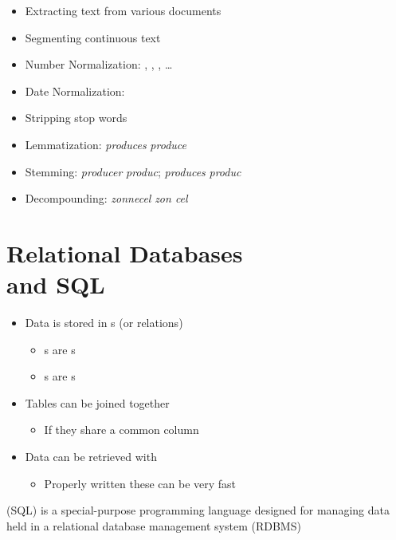 \documentclass[a4paper,landscape,headrule,footrule,xetex]{foils}
\begin{document}
\begin{itemize}
\item Extracting text from various documents
\item Segmenting continuous text
\item Number Normalization:  
  , , ,  \ldots
\item Date Normalization:    
\item Stripping stop words
\item Lemmatization:  \textit{produces}   \infers \textit{produce}
\item Stemming:  \textit{producer}   \infers \textit{produc}; \textit{produces}   \infers \textit{produc}
\item Decompounding: \textit{zonnecel}  \infers \textit{zon cel}
\end{itemize}


\section{Relational Databases \\ and SQL}


\begin{itemize}
\item Data is stored in s (or relations)
  \begin{itemize}
  \item {}s are  s
  \item {}s are s
  \end{itemize}
    \item Tables can be joined together
  \begin{itemize}
  \item If they share a common column
  \end{itemize}
\item Data can be retrieved with 
  \begin{itemize}
  \item Properly written these can be very fast
  \end{itemize}
\end{itemize}
 (SQL) is a special-purpose
programming language designed for managing data held in a relational
database management system (RDBMS)
\end{document}

